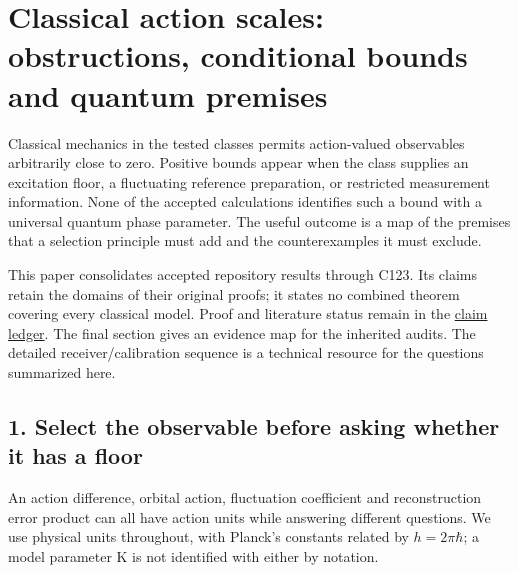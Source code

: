 \documentclass[11pt,a4paper]{article}
\begin{document}
\hypertarget{classical-action-scales-obstructions-conditional-bounds-and-quantum-premises}{%
\section{Classical action scales: obstructions, conditional bounds and
quantum
premises}\label{classical-action-scales-obstructions-conditional-bounds-and-quantum-premises}}

Classical mechanics in the tested classes permits action-valued
observables arbitrarily close to zero. Positive bounds appear when the
class supplies an excitation floor, a fluctuating reference preparation,
or restricted measurement information. None of the accepted calculations
identifies such a bound with a universal quantum phase parameter. The
useful outcome is a map of the premises that a selection principle must
add and the counterexamples it must exclude.

This paper consolidates accepted repository results through C123. Its
claims retain the domains of their original proofs; it states no
combined theorem covering every classical model. Proof and literature
status remain in the \href{../claims/LEDGER.md}{claim ledger}. The final
section gives an evidence map for the inherited audits. The detailed
receiver/calibration sequence is a technical resource for the questions
summarized here.

\hypertarget{select-the-observable-before-asking-whether-it-has-a-floor}{%
\subsection{1. Select the observable before asking whether it has a
floor}\label{select-the-observable-before-asking-whether-it-has-a-floor}}

An action difference, orbital action, fluctuation coefficient and
reconstruction error product can all have action units while answering
different questions. We use physical units throughout, with Planck's
constants related by \(h=2\pi\hbar\); a model parameter K is not
identified with either by notation.
\end{document}
